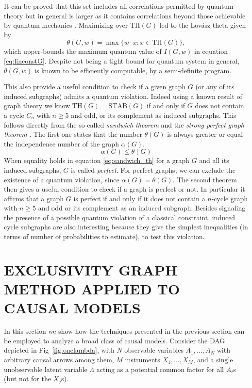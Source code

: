 \documentclass[letterpaper]{article}
\newcommand{\STAB}{\mathrm{STAB}}
\renewcommand{\TH}{\mathrm{TH}}
\begin{document}
It can be proved that this set includes all correlations permitted by quantum theory 
but in general is larger as it contains correlations beyond those achievable by quantum
mechanics \cite{almostquantum2015}.
Maximizing over $\TH(G)$ led to the Lovász theta given by
\begin{equation}
    \theta(G,w) = \max \{w\cdot x : x \in \TH(G)\},
    \label{eq:lovasztheta}
\end{equation}
which upper-bounds the maximum quantum value of $I(G,w)$ in equation
\eqref{eq:linconstG}.  Despite not being a tight bound for quantum
system in general, $\theta(G,w)$ is known to be efficiently computable,
by a semi-definite program.

This also provide a useful condition to check if a given graph $G$ (or
any of its induced subgraphs) admits a quantum violation.  Indeed using
a known result of graph theory we know $\TH(G) = \STAB(G)$ if and only
if $G$ does not contain a cycle $C_n$ with $n \ge 5$ and odd, or its
complement as induced subgraphs.  This follows directly from the so
called \emph{sandwich theorem} \cite{knuth,lovasz} and the \emph{strong
perfect graph theorem} \cite{spgth}.  The first one states that the
number $\theta(G)$ is always greater or equal the independence number
of the graph $\alpha(G)$.
\begin{equation}
    \alpha(G) \le \theta(G)
    \label{eq:sandwich_th}
\end{equation}
When equality holds in equation \eqref{eq:sandwich_th} for a graph
$G$ and all its induced subgraphs, $G$ is called \emph{perfect}.
For perfect graphs, we can exclude the existence of a quantum violation,
since $\alpha(G) = \theta(G)$.  The second theorem then gives a useful
condition to check if a graph is perfect or not. In particular it affirms
that a graph $G$ is perfect if and only if it does not contain a $n$-cycle
graph with $n\ge5$ and odd or its complement as an induced subgraph.
Besides signaling the presence of a possible quantum violation of
a classical constraint, induced cycle subgraphs are also interesting
because they give the simplest inequalities (in terms of number of
probabilities to estimate), to test this violation.

\section{EXCLUSIVITY GRAPH METHOD APPLIED TO CAUSAL MODELS}
In this section we show how the techniques presented in the
previous section can be employed to analyze a broad class of causal
models. Consider the DAG depicted in Fig~\ref{fig:onelambda}, with $N$
observable variables $A_1, \ldots, A_N$ with arbitrary causal arrows
among them, $M$ instruments $X_1, \ldots, X_M$, and a single unobservable
latent variable $\Lambda$ acting as a potential common factor for all
$A_i$s (but not for the $X_j$s).
\end{document}
